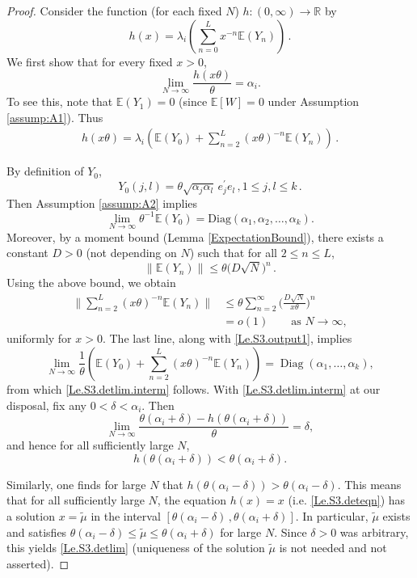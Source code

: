 \documentclass[11pt, reqno]{amsart}
\numberwithin{equation}{section}
\newcommand{\E}{\mbox{${\mathbb E}$}}
\newcommand{\reals}{{\mathbb R}}
\newcommand{\bbr}{\reals}
\begin{document}
\begin{proof}
Consider the function (for each fixed $N$) $h:(0,\infty)\to\bbr$ by
\[
h(x)=\lambda_i\left(\sum_{n=0}^Lx^{-n}\mathbb E(Y_n)\right)\,.
\]
We first show that for every fixed $x>0$,
\begin{equation}\label{Le.S3.detlim.interm}
\lim_{N\to\infty}\frac{h(x\theta)}{\theta} = \alpha_i.
\end{equation}
To see this, note that $\E(Y_1) = 0$ (since $\E[W]=0$ under Assumption \ref{assump:A1}). Thus
\begin{align*}
h\left(x\theta\right)=\lambda_i\left(\mathbb E(Y_0)+\sum_{n=2}^L(x\theta)^{-n}\mathbb E(Y_n)\right)\,.
\end{align*}

By definition of $Y_0$,
\[
Y_0(j,l)=\theta\sqrt{\alpha_j\alpha_l}\,e_j^\prime e_l\,,1\le j,l\le k\,.
\]
Then Assumption \ref{assump:A2} implies
\begin{equation}\label{Le.S3.output1}
\lim_{N\to\infty}\theta^{-1}\E(Y_0) = \mathrm{Diag}(\alpha_1,\alpha_2,\ldots,\alpha_k).
\end{equation}
Moreover, by a moment bound (Lemma \ref{ExpectationBound}), there exists a constant $D>0$ (not depending on $N$) such that for all $2 \le n \le L$,
\begin{equation}\label{EYn.norm}
\|\E(Y_n)\| \le \theta\big(D\sqrt{N}\big)^{n}\,.
\end{equation}
Using the above bound, we obtain
\begin{align*}
\|\sum_{n=2}^L (x\theta)^{-n}\E(Y_n)\| &\le \theta \sum_{n=2}^\infty \Big(\frac{D\sqrt{N}}{x\theta} \Big)^n \\
&=o(1) \qquad \text{as } N \to \infty,
\end{align*}
uniformly for $x>0$. The last line, along with \eqref{Le.S3.output1}, implies
\[
\lim _{N \rightarrow \infty} \frac{1}{\theta}\left(\E\left(Y_0\right)+\sum_{n=2}^L(x \theta)^{-n} \E\left(Y_n\right)\right)=\operatorname{Diag}\left(\alpha_1, \ldots, \alpha_k\right),\]
from which \eqref{Le.S3.detlim.interm} follows. With \eqref{Le.S3.detlim.interm} at our disposal, fix any $0 < \delta < \alpha_i$. Then
\[
\lim _{N \rightarrow \infty} \frac{\theta\left(\alpha_i+\delta\right)-h\left(\theta\left(\alpha_i+\delta\right)\right)}{\theta}=\delta,
\]
and hence for all sufficiently large $N$,
\[
h\left(\theta\left(\alpha_i+\delta\right)\right)<\theta\left(\alpha_i+\delta\right).
\]

Similarly, one finds for large $N$ that $h(\theta(\alpha_i - \delta)) > \theta(\alpha_i - \delta)$. This means that for all sufficiently large $N$, the equation $h(x) = x$ (i.e. \eqref{Le.S3.deteqn}) has a solution $x=\tilde{\mu}$ in the interval $[\theta(\alpha_i-\delta)\,,\theta(\alpha_i+\delta)]$. In particular, $\tilde{\mu}$ exists and satisfies
$\theta\left(\alpha_i-\delta\right) \leq \tilde{\mu} \leq \theta\left(\alpha_i+\delta\right)$
for large $N$. Since $\delta>0$ was arbitrary, this yields \eqref{Le.S3.detlim} (uniqueness of the solution $\tilde{\mu}$ is not needed and not asserted).
\end{proof}
\end{document}
